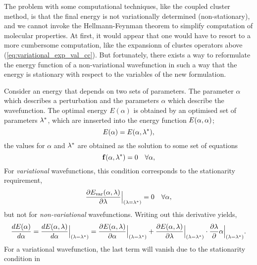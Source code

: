 The problem with some computational techniques, like the coupled cluster method,
is that the final energy is not variationally determined (non-stationary), 
and we cannot invoke the Hellmann-Feynman theorem to simplify computation of 
molecular properties. At first, it would appear that one would have to resort to 
a more cumbersome computation, like the expansionn of clustes operators above 
(\autoref{eq:variational_exp_val_cc}). But fortunately, there exists a way to 
reformulate the energy function of a non-variational wavefunction in such a way that 
the energy is stationary with respect to the variables of the new formulation.

Consider an energy that depends on two sets of parameters. The parameter $\alpha$ which 
describes a perturbation and the parameters $\alpha$ which describe the wavefunction. 
The optimal energy $E(\alpha)$ is obtained by an optimised set of parameters $\vb{\lambda}^*$,
which are innserted into the energy function $E(\alpha, \vb{\alpha})$;
\begin{equation}
    E(\alpha) = E(\alpha, \vb{\lambda}^*),
\end{equation}
the values for $\alpha$ and $\vb{\lambda}^*$ are obtained as the solution to some set of 
equations
\begin{equation}
    \label{eq:nonvar_cond_HellF}
    \vb{f}(\alpha, \vb{\lambda}^*) = 0 \quad \forall \alpha,
\end{equation}
For \emph{variational} wavefunctions, this condition corresponds to the stationarity requirement,
\begin{equation}
    \label{eq:stat_cond_HellF}
    \frac{\partial E_{\text{var}}(\alpha, \vb{\lambda})}
    {\partial \lambda}\Big\lvert_{(\vb{\lambda} = \vb{\lambda}^*)}
    = 0 \quad \forall \alpha,
\end{equation}
but not for \emph{non-variational} wavefunctions. Writing out this derivative yields,
\begin{equation}
\label{eq:total_derivative_HellF_energy}
\frac{dE(\alpha)}{d\alpha} 
= \frac{dE(\alpha, \vb{\lambda})}{d\alpha}\Big\lvert_{(\vb{\lambda} = \vb{\lambda}^*)}
= \frac{\partial E(\alpha, \vb{\lambda})}{\partial\alpha}\Big\lvert_{(\vb{\lambda} = \vb{\lambda}^*)}
+ \frac{\partial E(\alpha, \vb{\lambda})}{\partial\vb{\lambda}}\Big\lvert_{(\vb{\lambda} = \vb{\lambda}^*)}
\cdot
\frac{\partial \vb{\lambda}}{\partial}\alpha\Big\lvert_{(\vb{\lambda} = \vb{\lambda}^*)}.
\end{equation}
For a variational wavefunction, the last term will vanish due to the stationarity condition in 

